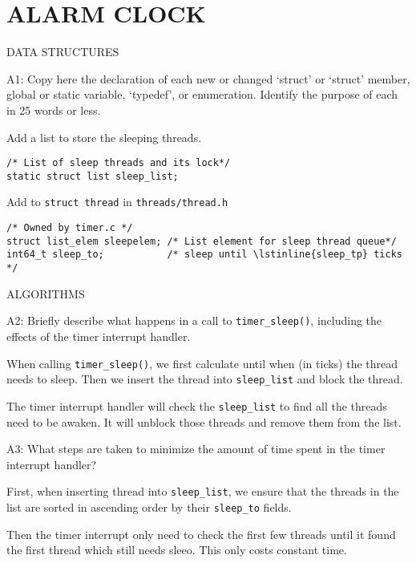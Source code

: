 
\section{ALARM CLOCK}

\begin{aspect}{DATA STRUCTURES}
  \begin{qc}
    A1: Copy here the declaration of each new or changed `struct' or
    `struct' member, global or static variable, `typedef', or
    enumeration.  Identify the purpose of each in 25 words or less.
  \end{qc}
  Add a list to store the sleeping threads.
  \begin{lstlisting}
/* List of sleep threads and its lock*/
static struct list sleep_list;
  \end{lstlisting}
  Add to \lstinline{struct thread} in \lstinline{threads/thread.h}
  \begin{lstlisting}
/* Owned by timer.c */
struct list_elem sleepelem; /* List element for sleep thread queue*/
int64_t sleep_to;           /* sleep until \lstinline{sleep_tp} ticks */
  \end{lstlisting}
\end{aspect}
\begin{aspect}{ALGORITHMS}
  \begin{qc}
    A2: Briefly describe what happens in a call to \lstinline{timer_sleep()}, including the effects of the timer interrupt handler.
  \end{qc}
  When calling \lstinline{timer_sleep()}, we first calculate until when (in ticks) the thread needs to sleep. Then we insert the thread into \lstinline{sleep_list} and block the thread.

  The timer interrupt handler will check the \lstinline{sleep_list} to find all the threads need to be awaken. It will unblock those threads and remove them from the list.

  \begin{qc}
    A3: What steps are taken to minimize the amount of time spent in the timer interrupt handler?
  \end{qc}

  First, when inserting thread into \lstinline{sleep_list}, we ensure that the threads in the list are sorted in ascending order by their \lstinline{sleep_to} fields.

  Then the timer interrupt only need to check the first few threads until it found the first thread which still needs sleeo. This only costs constant time.
\end{aspect}

